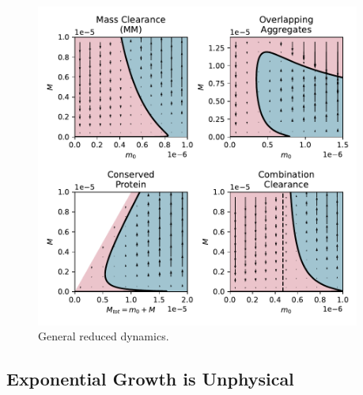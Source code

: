 \begin{figure}
    \centering
    \includegraphics[width=0.95\textwidth]{figures/4-agg-figs/generalisingReduced_nocol.pdf}
    \caption{General reduced dynamics.}
    \label{fig:4-generalReduced}
\end{figure}

\subsection{Exponential Growth is Unphysical}

